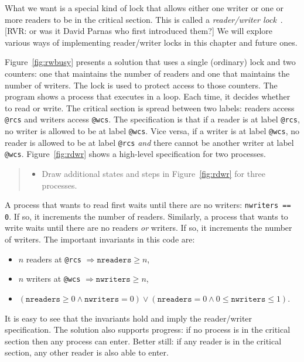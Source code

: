 \documentclass{report}
\begin{document}
What we want is a special kind of lock that allows either one writer
or one or more readers to be in the critical section.  This is called
a \emph{reader/writer lock}~\cite{courtois71}.
[RVR: or was it David Parnas who first introduced them?]
We will explore various ways of implementing reader/writer locks in
this chapter and future ones.

Figure~\ref{fig:rwbusy} presents a solution that uses a
single (ordinary) lock and two counters: one that maintains the number
of readers and one that maintains the number of writers.
The lock is used to protect access to those counters.
The program shows a process that executes in a loop.
Each time, it decides whether to read or write.
The critical section is spread between two labels:
readers access \texttt{@rcs} and writers access \texttt{@wcs}.
The specification is that if a reader is at label \texttt{@rcs},
no writer is allowed to be at label \texttt{@wcs}.  Vice versa, if
a writer is at label \texttt{@wcs}, no reader is allowed to be at
label \texttt{@rcs} \emph{and} there cannot be another writer at
label \texttt{@wcs}.  Figure~\ref{fig:rdwr} shows a high-level
specification for two processes.

\begin{quote}
\begin{itemize}
\item Draw additional states and steps in Figure~\ref{fig:rdwr}
for three processes.
\end{itemize}
\end{quote}

A process that wants to read first waits until there are no writers:
\texttt{nwriters == 0}.  If so, it increments the number of readers.
Similarly, a
process that wants to write waits until there are no readers \emph{or} writers.
If so, it increments the number of writers.
The important invariants in this code are:
\begin{itemize}
\item $n$ readers at \texttt{@rcs} $\Rightarrow \mathtt{nreaders} \ge n$,
\item $n$ writers at \texttt{@wcs} $\Rightarrow \mathtt{nwriters} \ge n$,
\item $(\mathtt{nreaders} \ge 0 \land \mathtt{nwriters} = 0) \lor
    (\mathtt{nreaders} = 0 \land 0 \le \mathtt{nwriters} \le 1)$.
\end{itemize}
It is easy to see that the invariants hold and imply the reader/writer
specification.
The solution also supports progress: if no process is in the critical
section then any process can enter.  Better still: if any reader is in the
critical section, any other reader is also able to enter.
\end{document}
